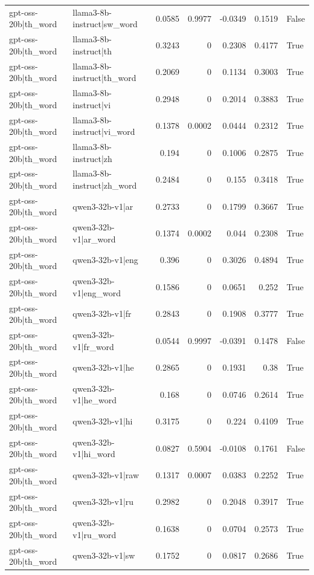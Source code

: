\begin{table}
\begin{tabular}{l l r r r r l}
gpt-oss-20b|th_word & llama3-8b-instruct|sw_word & 0.0585 & 0.9977 & -0.0349 & 0.1519 & False \\
gpt-oss-20b|th_word & llama3-8b-instruct|th & 0.3243 & 0 & 0.2308 & 0.4177 & True \\
gpt-oss-20b|th_word & llama3-8b-instruct|th_word & 0.2069 & 0 & 0.1134 & 0.3003 & True \\
gpt-oss-20b|th_word & llama3-8b-instruct|vi & 0.2948 & 0 & 0.2014 & 0.3883 & True \\
gpt-oss-20b|th_word & llama3-8b-instruct|vi_word & 0.1378 & 0.0002 & 0.0444 & 0.2312 & True \\
gpt-oss-20b|th_word & llama3-8b-instruct|zh & 0.194 & 0 & 0.1006 & 0.2875 & True \\
gpt-oss-20b|th_word & llama3-8b-instruct|zh_word & 0.2484 & 0 & 0.155 & 0.3418 & True \\
gpt-oss-20b|th_word & qwen3-32b-v1|ar & 0.2733 & 0 & 0.1799 & 0.3667 & True \\
gpt-oss-20b|th_word & qwen3-32b-v1|ar_word & 0.1374 & 0.0002 & 0.044 & 0.2308 & True \\
gpt-oss-20b|th_word & qwen3-32b-v1|eng & 0.396 & 0 & 0.3026 & 0.4894 & True \\
gpt-oss-20b|th_word & qwen3-32b-v1|eng_word & 0.1586 & 0 & 0.0651 & 0.252 & True \\
gpt-oss-20b|th_word & qwen3-32b-v1|fr & 0.2843 & 0 & 0.1908 & 0.3777 & True \\
gpt-oss-20b|th_word & qwen3-32b-v1|fr_word & 0.0544 & 0.9997 & -0.0391 & 0.1478 & False \\
gpt-oss-20b|th_word & qwen3-32b-v1|he & 0.2865 & 0 & 0.1931 & 0.38 & True \\
gpt-oss-20b|th_word & qwen3-32b-v1|he_word & 0.168 & 0 & 0.0746 & 0.2614 & True \\
gpt-oss-20b|th_word & qwen3-32b-v1|hi & 0.3175 & 0 & 0.224 & 0.4109 & True \\
gpt-oss-20b|th_word & qwen3-32b-v1|hi_word & 0.0827 & 0.5904 & -0.0108 & 0.1761 & False \\
gpt-oss-20b|th_word & qwen3-32b-v1|raw & 0.1317 & 0.0007 & 0.0383 & 0.2252 & True \\
gpt-oss-20b|th_word & qwen3-32b-v1|ru & 0.2982 & 0 & 0.2048 & 0.3917 & True \\
gpt-oss-20b|th_word & qwen3-32b-v1|ru_word & 0.1638 & 0 & 0.0704 & 0.2573 & True \\
gpt-oss-20b|th_word & qwen3-32b-v1|sw & 0.1752 & 0 & 0.0817 & 0.2686 & True \\

\end{tabular}
\end{table}
